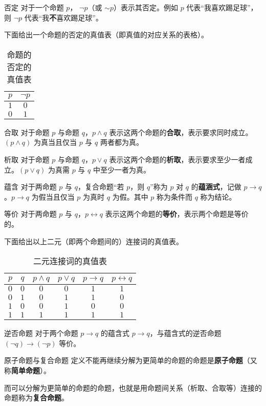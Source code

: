 
\begin{definition}{否定}
对于一个命题 $p$， $\neg p$（或 $\sim p$）表示其否定。例如 $p$ 代表“我喜欢踢足球”，则 $\neg p$ 代表“我\textbf{不}喜欢踢足球”。
\end{definition}

下面给出一个命题的否定的真值表（即真值的对应关系的表格）。
\begin{table}[ht]
\centering
\caption{命题的否定的真值表}\label{tab_propco1}
\begin{tabular}{|c|c|}
\hline
$p$ & $\neg p$ \\
\hline
$1$ & $0$ \\
\hline
$0$ & $1$ \\
\hline
\end{tabular}
\end{table}


\begin{definition}{合取}
对于命题 $p$ 与命题 $q$，$p \land q$ 表示这两个命题的\textbf{合取}，表示要求同时成立。$(p \land q)$ 为真当且仅当 $p$ 与 $q$ 两者都为真。
\end{definition}

\begin{definition}{析取}
对于命题 $p$ 与命题 $q$，$p \lor q$ 表示这两个命题的\textbf{析取}，表示要求至少一者成立。$(p \lor q)$ 为真需 $p$ 与 $q$ 中至少一者为真。
\end{definition}

\begin{definition}{蕴含}
对于两命题 $p$ 与 $q$，复合命题“若 $p$，则 $q$”称为 $p$ 对 $q$ 的\textbf{蕴涵式}，记做 $p \to q$。$p \to q$ 为假当且仅当 $p$ 为真时 $q$ 为假。其中 $p$ 称为条件而 $q$ 称为结论。
\end{definition}

\begin{definition}{等价}
对于两命题 $p$ 与 $q$，$p \leftrightarrow q$ 表示这两个命题的\textbf{等价}，表示两个命题是等价的。
\end{definition}

下面给出以上二元（即两个命题间的）连接词的真值表。
\begin{table}[ht]
\centering
\caption{二元连接词的真值表}\label{tab_propco2}
\begin{tabular}{|c|c|c|c|c|c|}
\hline
$p$ & $q$ & $p \land q$ & $p \lor q$ & $p \to q$ & $p \leftrightarrow q$ \\
\hline
$0$ & $0$ & $0$ & $0$ & $1$ & $1$ \\
\hline
$0$ & $1$ & $0$ & $1$ & $1$ & $0$ \\
\hline
$1$ & $0$ & $0$ & $1$ & $0$ & $0$ \\
\hline
$1$ & $1$ & $1$ & $1$ & $1$ & $1$ \\
\hline
\end{tabular}
\end{table}


\begin{theorem}{逆否命题}
对于两个命题 $p \rightarrow q$ 的蕴含式 $p \rightarrow q$，与蕴含式的逆否命题 $(\neg q) \rightarrow (\neg p)$ 等价。
\end{theorem}

\begin{definition}{原子命题与复合命题}
定义不能再继续分解为更简单的命题的命题是\textbf{原子命题}（又称\textbf{简单命题}）。

而可以分解为更简单的命题的命题，也就是用命题间关系（析取、合取等）连接的命题称为\textbf{复合命题}。
\end{definition}